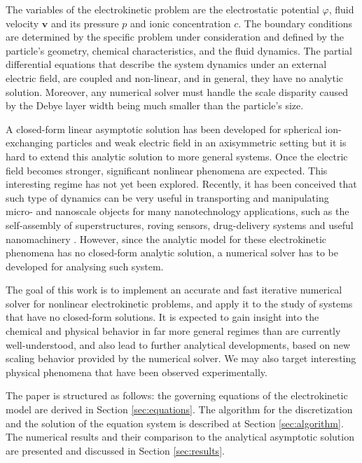 \documentclass[final]{elsarticle}
\newcommand\bv{\boldsymbol{v}}
\begin{document}
The variables of the electrokinetic problem are the electrostatic
potential $\varphi$, fluid velocity $\bv$ and its pressure $p$ and
ionic concentration $c$.
The boundary conditions are determined by the specific
problem under consideration and defined by the particle's
geometry, chemical characteristics, and the fluid dynamics.
The partial differential equations that describe the system dynamics
under an external electric field, are coupled and non-linear, and
in general, they have no analytic solution. 
Moreover, any numerical solver must handle the scale disparity caused by the
Debye layer width being much smaller than the particle's size. 

A closed-form linear asymptotic solution has been developed for
spherical ion-exchanging particles and weak electric field in an
axisymmetric setting \cite{yariv2010migration} but it is hard to extend this
analytic solution to more general systems. Once the electric field
becomes stronger, significant nonlinear phenomena are expected.
This interesting regime has not yet been explored.
Recently, it has been conceived that such type of dynamics
can be very useful in transporting and manipulating micro-
and nanoscale objects for many nanotechnology applications,
such as the self-assembly of superstructures, roving sensors, 
drug-delivery systems and useful nanomachinery 
\cite{howse2007self,paxton2004catalytic,pumera2010electrochemically}.
However, since the analytic model for these electrokinetic
phenomena has no closed-form analytic solution, a numerical
solver has to be developed for analysing such system.

The goal of this work is to implement an accurate and fast iterative numerical
solver for nonlinear electrokinetic problems, and apply it to the study
of systems that have no closed-form solutions.
It is expected to gain insight into the chemical and physical behavior 
in far more general regimes than are currently well-understood, 
and also lead to further analytical developments, based on new scaling behavior
provided by the numerical solver. We may also target interesting physical
phenomena that have been observed experimentally.

The paper is structured as follows: the governing equations of the electrokinetic model
are derived in Section \ref{sec:equations}. The algorithm for the discretization and 
the solution of the equation system is described at Section \ref{sec:algorithm}.
The numerical results and their comparison to the analytical asymptotic solution 
are presented and discussed in Section \ref{sec:results}. 
\end{document}
